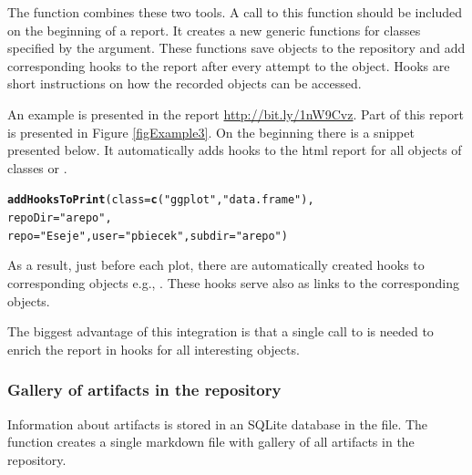 \documentclass[nojss]{jss}\usepackage[]{graphicx}\usepackage[]{color}
\makeatletter
\newcommand{\hlstr}[1]{\textcolor[rgb]{0.192,0.494,0.8}{#1}}%
\newcommand{\hlstd}[1]{\textcolor[rgb]{0.345,0.345,0.345}{#1}}%
\newcommand{\hlkwc}[1]{\textcolor[rgb]{0.333,0.667,0.333}{#1}}%
\newcommand{\hlkwd}[1]{\textcolor[rgb]{0.737,0.353,0.396}{\textbf{#1}}}%
\newenvironment{kframe}{%
 \def\at@end@of@kframe{}%
 \ifinner\ifhmode%
  \def\at@end@of@kframe{\end{minipage}}%
  \begin{minipage}{\columnwidth}%
 \fi\fi%
 \def\FrameCommand##1{\hskip\@totalleftmargin \hskip-\fboxsep
 \colorbox{shadecolor}{##1}\hskip-\fboxsep
     \hskip-\linewidth \hskip-\@totalleftmargin \hskip\columnwidth}%
 \MakeFramed {\advance\hsize-\width
   \@totalleftmargin\z@ \linewidth\hsize
   \@setminipage}}%
 {\par\unskip\endMakeFramed%
 \at@end@of@kframe}
\newenvironment{knitrout}{}{} %
\makeatother
\begin{document}
The function  combines these two tools. A call to this function should be included on the beginning of a  report. It creates a new generic  functions for classes specified by the  argument. These functions save objects to the repository and add corresponding hooks to the report after every attempt to  the object. Hooks are short instructions on how the recorded objects can be accessed. 

An example is presented in the report \url{http://bit.ly/1nW9Cvz}. Part of this report is presented in Figure \ref{figExample3}.
On the beginning there is a snippet presented below. It automatically adds hooks to the html report for all objects of classes  or . 

\begin{knitrout}
\color{fgcolor}\begin{kframe}
\begin{alltt}
\hlkwd{addHooksToPrint}\hlstd{(}\hlkwc{class}\hlstd{=}\hlkwd{c}\hlstd{(}\hlstr{"ggplot"}\hlstd{,} \hlstr{"data.frame"}\hlstd{),}
                  \hlkwc{repoDir} \hlstd{=} \hlstr{"arepo"}\hlstd{,}
                  \hlkwc{repo} \hlstd{=} \hlstr{"Eseje"}\hlstd{,} \hlkwc{user} \hlstd{=} \hlstr{"pbiecek"}\hlstd{,} \hlkwc{subdir} \hlstd{=} \hlstr{"arepo"}\hlstd{)}
\end{alltt}
\end{kframe}
\end{knitrout}

As a result, just before each plot, there are automatically created hooks to corresponding objects e.g., . These hooks serve also as links to the corresponding  objects.

The biggest advantage of this integration is that a single call to  is needed to enrich the  report in  hooks for all interesting objects.



\subsubsection{Gallery of artifacts in the repository}

 Information about artifacts is stored in an SQLite database in the  file. The  function creates a single markdown file with gallery of all artifacts in the repository. 
\end{document}
